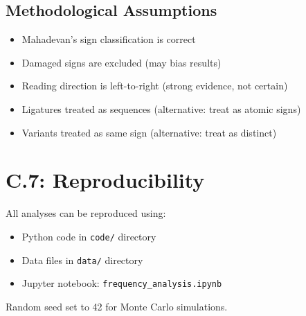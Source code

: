 \subsection*{Methodological Assumptions}

\begin{itemize}
    \item Mahadevan's sign classification is correct
    \item Damaged signs are excluded (may bias results)
    \item Reading direction is left-to-right (strong evidence, not certain)
    \item Ligatures treated as sequences (alternative: treat as atomic signs)
    \item Variants treated as same sign (alternative: treat as distinct)
\end{itemize}

\section*{C.7: Reproducibility}

All analyses can be reproduced using:
\begin{itemize}
    \item Python code in \texttt{code/} directory
    \item Data files in \texttt{data/} directory
    \item Jupyter notebook: \texttt{frequency\_analysis.ipynb}
\end{itemize}

Random seed set to 42 for Monte Carlo simulations.
